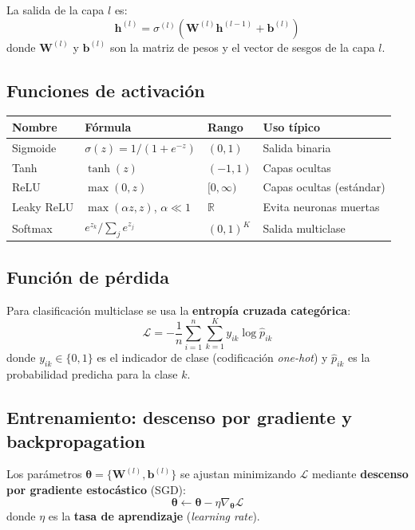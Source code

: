 \documentclass[12pt, a4paper]{article}
\theoremstyle{definition}
\theoremstyle{plain}
\theoremstyle{remark}
\newcommand{\R}{\mathbb{R}}
\begin{document}
La salida de la capa $l$ es:
\[
  \bm{h}^{(l)} = \sigma^{(l)}\!\left(\bm{W}^{(l)} \bm{h}^{(l-1)} + \bm{b}^{(l)}\right)
\]
donde $\bm{W}^{(l)}$ y $\bm{b}^{(l)}$ son la matriz de pesos y el vector de sesgos de la capa $l$.

\subsection{Funciones de activación}

\begin{center}
\begin{tabular}{llll}
  \toprule
  \textbf{Nombre} & \textbf{Fórmula} & \textbf{Rango} & \textbf{Uso típico} \\
  \midrule
  Sigmoide & $\sigma(z) = 1/(1+e^{-z})$ & $(0,1)$ & Salida binaria \\
  Tanh & $\tanh(z)$ & $(-1,1)$ & Capas ocultas \\
  ReLU & $\max(0, z)$ & $[0,\infty)$ & Capas ocultas (estándar) \\
  Leaky ReLU & $\max(\alpha z, z)$, $\alpha \ll 1$ & $\R$ & Evita neuronas muertas \\
  Softmax & $e^{z_k}/\sum_j e^{z_j}$ & $(0,1)^K$ & Salida multiclase \\
  \bottomrule
\end{tabular}
\end{center}

\subsection{Función de pérdida}

Para clasificación multiclase se usa la \textbf{entropía cruzada categórica}:
\[
  \mathcal{L} = -\frac{1}{n}\sum_{i=1}^{n}\sum_{k=1}^{K} y_{ik} \log \hat{p}_{ik}
\]
donde $y_{ik} \in \{0,1\}$ es el indicador de clase (codificación \textit{one-hot}) y $\hat{p}_{ik}$ es la probabilidad predicha para la clase $k$.

\subsection{Entrenamiento: descenso por gradiente y backpropagation}

Los parámetros $\bm{\theta} = \{\bm{W}^{(l)}, \bm{b}^{(l)}\}$ se ajustan minimizando $\mathcal{L}$ mediante \textbf{descenso por gradiente estocástico} (SGD):
\[
  \bm{\theta} \leftarrow \bm{\theta} - \eta \nabla_{\bm{\theta}} \mathcal{L}
\]
donde $\eta$ es la \textbf{tasa de aprendizaje} (\textit{learning rate}).
\end{document}
